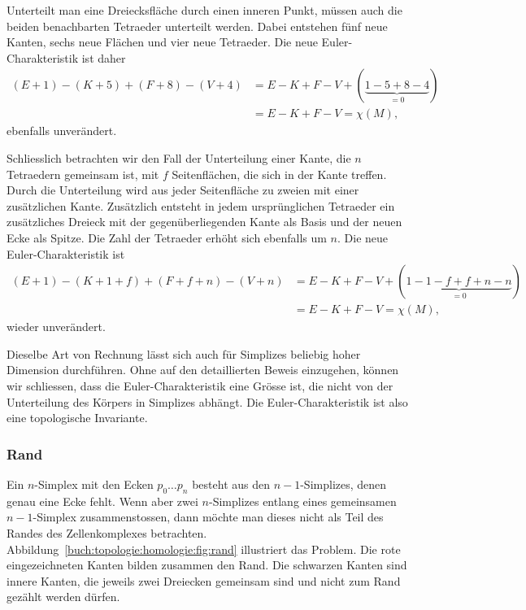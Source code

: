 Unterteilt man eine Dreiecksfläche durch einen inneren Punkt,
müssen auch die beiden benachbarten Tetraeder unterteilt werden.
Dabei entstehen fünf neue Kanten, sechs neue Flächen und vier
neue Tetraeder.
Die neue Euler-Charakteristik ist daher
\begin{align*}
(E+1) - (K+5) + (F+8) - (V+4)
&=
E-K+F-V
+(\underbrace{1-5+8-4}_{\displaystyle=0})
\\
&=
E-K+F-V
=
\chi(M),
\end{align*}
ebenfalls unverändert.

Schliesslich betrachten wir den Fall der Unterteilung einer Kante,
die $n$ Tetraedern gemeinsam ist, mit $f$ Seitenflächen, die sich
in der Kante treffen.
Durch die Unterteilung wird aus jeder Seitenfläche zu zweien
mit einer zusätzlichen Kante.
Zusätzlich entsteht in jedem ursprünglichen Tetraeder ein zusätzliches
Dreieck mit der gegenüberliegenden Kante als Basis und der neuen
Ecke als Spitze.
Die Zahl der Tetraeder erhöht sich ebenfalls um $n$.
Die neue Euler-Charakteristik ist
\begin{align*}
(E+1)
-
(K+1+f)
+
(F+f+n)
-
(V+n)
&=
E-K+F-V + (\underbrace{1-1-f+f+n-n}_{\displaystyle=0})
\\
&=
E-K+F-V
=
\chi(M),
\end{align*}
wieder unverändert.

Dieselbe Art von Rechnung lässt sich auch für Simplizes beliebig hoher
Dimension durchführen.
Ohne auf den detaillierten Beweis einzugehen, können wir schliessen,
dass die Euler-Charakteristik eine Grösse ist, die nicht von der Unterteilung
des Körpers in Simplizes abhängt.
Die Euler-Charakteristik ist also eine topologische Invariante.

%
%
\subsubsection{Rand}
%
Ein $n$-Simplex mit den Ecken $p_0\dots p_n$ besteht aus den $n-1$-Simplizes,
denen genau eine Ecke fehlt.
Wenn aber zwei $n$-Simplizes entlang eines gemeinsamen $n-1$-Simplex
zusammenstossen, dann möchte man dieses nicht als Teil des Randes
des Zellenkomplexes betrachten.
Abbildung~\ref{buch:topologie:homologie:fig:rand} illustriert das Problem.
Die rote eingezeichneten Kanten bilden zusammen den Rand.
Die schwarzen Kanten sind innere Kanten, die jeweils zwei Dreiecken 
gemeinsam sind und nicht zum Rand gezählt werden dürfen.


%
%

